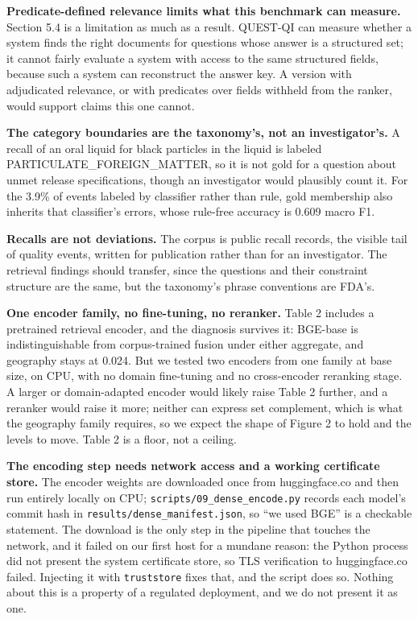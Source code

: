 \documentclass[runningheads]{llncs}
\begin{document}
\textbf{Predicate-defined relevance limits what this benchmark can measure.} Section 5.4 is a limitation as much as a result. QUEST-QI can measure whether a system finds the right documents for questions whose answer is a structured set; it cannot fairly evaluate a system with access to the same structured fields, because such a system can reconstruct the answer key. A version with adjudicated relevance, or with predicates over fields withheld from the ranker, would support claims this one cannot.

\textbf{The category boundaries are the taxonomy's, not an investigator's.} A recall of an oral liquid for black particles in the liquid is labeled PARTICULATE\_FOREIGN\_MATTER, so it is not gold for a question about unmet release specifications, though an investigator would plausibly count it. For the 3.9\% of events labeled by classifier rather than rule, gold membership also inherits that classifier's errors, whose rule-free accuracy is 0.609 macro F1.

\textbf{Recalls are not deviations.} The corpus is public recall records, the visible tail of quality events, written for publication rather than for an investigator. The retrieval findings should transfer, since the questions and their constraint structure are the same, but the taxonomy's phrase conventions are FDA's.

\textbf{One encoder family, no fine-tuning, no reranker.} Table 2 includes a pretrained retrieval encoder, and the diagnosis survives it: BGE-base is indistinguishable from corpus-trained fusion under either aggregate, and geography stays at 0.024. But we tested two encoders from one family at base size, on CPU, with no domain fine-tuning and no cross-encoder reranking stage. A larger or domain-adapted encoder would likely raise Table 2 further, and a reranker would raise it more; neither can express set complement, which is what the geography family requires, so we expect the shape of Figure 2 to hold and the levels to move. Table 2 is a floor, not a ceiling.

\textbf{The encoding step needs network access and a working certificate store.} The encoder weights are downloaded once from huggingface.co and then run entirely locally on CPU; \texttt{scripts/09\_\allowbreak{}dense\_\allowbreak{}encode.py} records each model's commit hash in \texttt{results/dense\_\allowbreak{}manifest.json}, so ``we used BGE'' is a checkable statement. The download is the only step in the pipeline that touches the network, and it failed on our first host for a mundane reason: the Python process did not present the system certificate store, so TLS verification to huggingface.co failed. Injecting it with \texttt{truststore} fixes that, and the script does so. Nothing about this is a property of a regulated deployment, and we do not present it as one.
\end{document}
